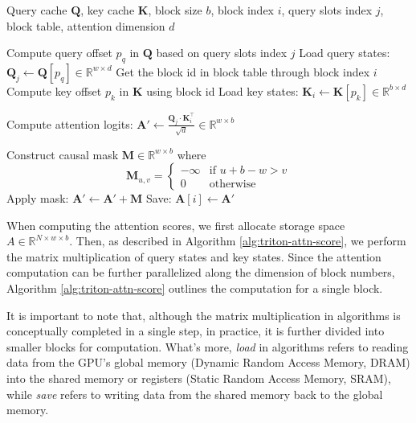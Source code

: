 \documentclass[11pt]{article}
\begin{document}
\label{sct:attention_score}
\begin{algorithm}
\caption{Block Attention Logits Computation}
\label{alg:triton-attn-score}
\begin{algorithmic}[1]
\Require 
    Query cache $\mathbf{Q}$, 
    key cache $\mathbf{K}$,
    block size $b$,  
    block index $i$,
    query slots index $j$,
    block table,
    attention dimension $d$
    
\State Compute query offset $p_q$ in $\mathbf{Q}$ based on query slots index $j$
\State Load query states: $\mathbf{Q}_j \gets \mathbf{Q}[p_q] \in \mathbb{R}^{w \times d}$
\State Get the block id in block table through block index $i$
\State Compute key offset $p_k$ in $\mathbf{K}$ using block id
\State Load key states: $\mathbf{K}_i \gets \mathbf{K}[p_k] \in \mathbb{R}^{b \times d}$

\State Compute attention logits: $\mathbf{A'} \gets  \frac{ \mathbf{Q}_j \cdot \mathbf{K}_i^\top}{\sqrt{d}} \in \mathbb{R}^{w \times b}$

    \State Construct causal mask $\mathbf{M} \in \mathbb{R}^{w \times b}$ where
    \[
    \mathbf M_{u,v} = 
    \begin{cases}
    -\infty & \text{if } u + b - w> v  \\
    0 & \text{otherwise}
    \end{cases}
    \]
    \State Apply mask: $\mathbf{A'} \gets \mathbf{A'} + \mathbf{M}$
\EndIf
\State Save: $\mathbf{A}[i] \gets \mathbf{A'}$
\end{algorithmic}
\end{algorithm}

When computing the attention scores, we first allocate storage space $A \in \mathbb{R}^{N \times w \times b}$. Then, as described in Algorithm \ref{alg:triton-attn-score}, we perform the matrix multiplication of query states and key states. Since the attention computation can be further parallelized along the dimension of block numbers, Algorithm \ref{alg:triton-attn-score} outlines the computation for a single block. 

It is important to note that, although the matrix multiplication in algorithms is conceptually completed in a single step, in practice, it is further divided into smaller blocks for computation. What's more, \textit{load} in algorithms refers to reading data from the GPU's global memory (Dynamic Random Access Memory, DRAM) into the shared memory or registers  (Static Random Access Memory, SRAM), while \textit{save} refers to writing data from the shared memory back to the global memory.
\end{document}
